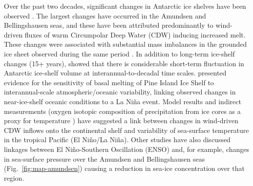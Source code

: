 Over the past two decades, significant changes in Antarctic ice shelves have been observed \parencite{Cook2010, Shepherd2010, Scambos2004, Scambos2009, Rignot2004, Rignot2014, Pritchard2012, Paolo2015}. The largest changes have occurred in the Amundsen and Bellingshausen seas, and these have been attributed predominantly to wind-driven fluxes of warm Circumpolar Deep Water (CDW) inducing increased melt. These changes were associated with substantial mass imbalances in the grounded ice sheet observed during the same period \parencite{Shepherd2012, Chen2009, Velicogna2009, Harig2015}. In addition to long-term ice-shelf changes (15+ years), \textcite{Paolo2015, Paolo2015a} showed that there is considerable short-term fluctuation in Antarctic ice-shelf volume at interannual-to-decadal time scales. \textcite{Dutrieux2014} presented evidence for the sensitivity of basal melting of Pine Island Ice Shelf to interannual-scale atmospheric/oceanic variability, linking observed changes in near-ice-shelf oceanic conditions to a La Ni\~na event. Model results \parencite{Steig2012} and indirect measurements (oxygen isotopic composition of precipitation from ice cores as a proxy for temperature \parencite{Steig2013}) have suggested a link between changes in wind-driven CDW inflows onto the continental shelf and variability of sea-surface temperature in the tropical Pacific (El Ni\~no/La Ni\~na). Other studies \textcite[such as ][]{Yuan2004, Turner2004} have also discussed linkages between El Ni\~{n}o-Southern Oscillation (ENSO) and, for example, changes in sea-surface pressure over the Amundsen and Bellingshausen seas (Fig.~\ref{fig:map-amundsen}) causing a reduction in sea-ice concentration over that region.


